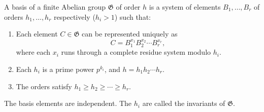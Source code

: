 A basis of a finite Abelian group $\mathfrak{G}$ of order $h$ is a system of elements $B_1, \ldots, B_r$ of orders $h_1, \ldots, h_r$ respectively ($h_i > 1$) such that:

\begin{enumerate}
\item Each element $C \in \mathfrak{G}$ can be represented uniquely as
$$C = B_1^{x_1} B_2^{x_2} \cdots B_r^{x_r},$$
where each $x_i$ runs through a complete residue system modulo $h_i$.
\item Each $h_i$ is a prime power $p^{k_i}$, and $h = h_1 h_2 \cdots h_r$.
\item The orders satisfy $h_1 \geq h_2 \geq \cdots \geq h_r$.
\end{enumerate}

The basis elements are independent. The $h_i$ are called the invariants of $\mathfrak{G}$.
